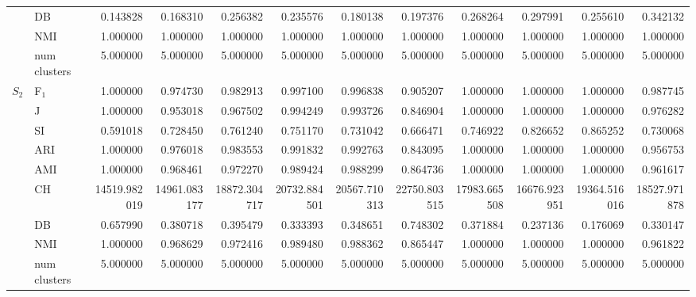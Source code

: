 \begin{tabular}{llrrrrrrrrrr}
 & DB & 0.143828 & 0.168310 & 0.256382 & 0.235576 & 0.180138 & 0.197376 & 0.268264 & 0.297991 & 0.255610 & 0.342132 \\
 & NMI & 1.000000 & 1.000000 & 1.000000 & 1.000000 & 1.000000 & 1.000000 & 1.000000 & 1.000000 & 1.000000 & 1.000000 \\
 & num clusters & 5.000000 & 5.000000 & 5.000000 & 5.000000 & 5.000000 & 5.000000 & 5.000000 & 5.000000 & 5.000000 & 5.000000 \\
\multirow[c]{9}{*}{$S_{2}$} & F$_1$ & 1.000000 & 0.974730 & 0.982913 & 0.997100 & 0.996838 & 0.905207 & 1.000000 & 1.000000 & 1.000000 & 0.987745 \\
 & J & 1.000000 & 0.953018 & 0.967502 & 0.994249 & 0.993726 & 0.846904 & 1.000000 & 1.000000 & 1.000000 & 0.976282 \\
 & SI & 0.591018 & 0.728450 & 0.761240 & 0.751170 & 0.731042 & 0.666471 & 0.746922 & 0.826652 & 0.865252 & 0.730068 \\
 & ARI & 1.000000 & 0.976018 & 0.983553 & 0.991832 & 0.992763 & 0.843095 & 1.000000 & 1.000000 & 1.000000 & 0.956753 \\
 & AMI & 1.000000 & 0.968461 & 0.972270 & 0.989424 & 0.988299 & 0.864736 & 1.000000 & 1.000000 & 1.000000 & 0.961617 \\
 & CH & 14519.982019 & 14961.083177 & 18872.304717 & 20732.884501 & 20567.710313 & 22750.803515 & 17983.665508 & 16676.923951 & 19364.516016 & 18527.971878 \\
 & DB & 0.657990 & 0.380718 & 0.395479 & 0.333393 & 0.348651 & 0.748302 & 0.371884 & 0.237136 & 0.176069 & 0.330147 \\
 & NMI & 1.000000 & 0.968629 & 0.972416 & 0.989480 & 0.988362 & 0.865447 & 1.000000 & 1.000000 & 1.000000 & 0.961822 \\
 & num clusters & 5.000000 & 5.000000 & 5.000000 & 5.000000 & 5.000000 & 5.000000 & 5.000000 & 5.000000 & 5.000000 & 5.000000 \\
\bottomrule
\end{tabular}
